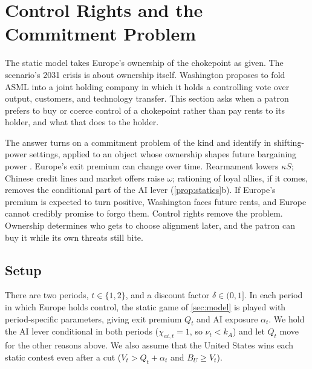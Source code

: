 \section{Control Rights and the Commitment Problem}\label{sec:control}

The static model takes Europe's ownership of the chokepoint as given. The scenario's 2031 crisis is about ownership itself. Washington proposes to fold ASML into a joint holding company in which it holds a controlling vote over output, customers, and technology transfer. This section asks when a patron prefers to buy or coerce control of a chokepoint rather than pay rents to its holder, and what that does to the holder.

The answer turns on a commitment problem of the kind \citet{fearon1995rationalist} and \citet{powell2006war} identify in shifting-power settings, applied to an object whose ownership shapes future bargaining power \citep{fearon1996bargaining}. Europe's exit premium can change over time. Rearmament lowers $\kappa S$; Chinese credit lines and market offers raise $\omega$; rationing of loyal allies, if it comes, removes the conditional part of the AI lever (\cref{prop:statics}b). If Europe's premium is expected to turn positive, Washington faces future rents, and Europe cannot credibly promise to forgo them. Control rights remove the problem. Ownership determines who gets to choose alignment later, and the patron can buy it while its own threats still bite.

\subsection{Setup}

There are two periods, $t \in \{1,2\}$, and a discount factor $\delta \in (0,1]$. In each period in which Europe holds control, the static game of \cref{sec:model} is played with period-specific parameters, giving exit premium $Q_t$ and AI exposure $\alpha_t$. We hold the AI lever conditional in both periods ($\chi_{ai,t}=1$, so $\nu_t < k_A$) and let $Q_t$ move for the other reasons above. We also assume that the United States wins each static contest even after a cut ($V_t > Q_t + \alpha_t$ and $B_U \geq V_t$).

